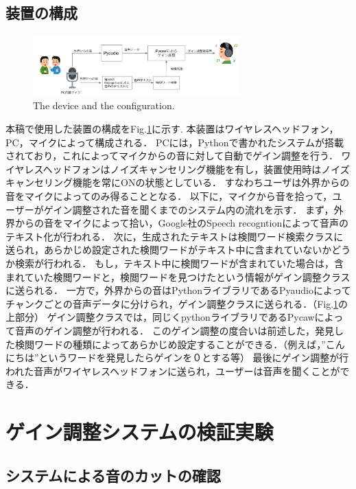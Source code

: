 \documentclass[a4paper]{jarticle}
\begin{document}
\subsection{装置の構成}
\begin{figure}[htbp]
    \begin{center}
    \includegraphics[width=80mm]{system.PNG}
    \caption{The device and the configuration.}
    \label{fig:system}
    \end{center}
    \end{figure}
本稿で使用した装置の構成をFig.\ref{fig:system}に示す.
本装置はワイヤレスヘッドフォン，PC，マイクによって構成される．
PCには，Pythonで書かれたシステムが搭載されており，これによってマイクからの音に対して自動でゲイン調整を行う．
ワイヤレスヘッドフォンはノイズキャンセリング機能を有し，装置使用時はノイズキャンセリング機能を常にONの状態としている．
すなわちユーザは外界からの音をマイクによってのみ得ることとなる．
以下に，マイクから音を拾って，ユーザーがゲイン調整された音を聞くまでのシステム内の流れを示す．
まず，外界からの音をマイクによって拾い，Google社のSpeech recogntionによって音声のテキスト化が行われる．
次に，生成されたテキストは検閲ワード検索クラスに送られ，あらかじめ設定された検閲ワードがテキスト中に含まれていないかどうか検索が行われる．
もし，テキスト中に検閲ワードが含まれていた場合は，含まれていた検閲ワードと，検閲ワードを見つけたという情報がゲイン調整クラスに送られる．
一方で，外界からの音はPythonライブラリであるPyaudioによってチャンクごとの音声データに分けられ，ゲイン調整クラスに送られる．（Fig.\ref{fig:system}の上部分）
ゲイン調整クラスでは，同じくpythonライブラリであるPycawによって音声のゲイン調整が行われる．
このゲイン調整の度合いは前述した，発見した検閲ワードの種類によってあらかじめ設定することができる．（例えば，”こんにちは”というワードを発見したらゲインを０とする等）
最後にゲイン調整が行われた音声がワイヤレスヘッドフォンに送られ，ユーザーは音声を聞くことができる．

\section{ゲイン調整システムの検証実験}
\subsection{システムによる音のカットの確認}
\end{document}
